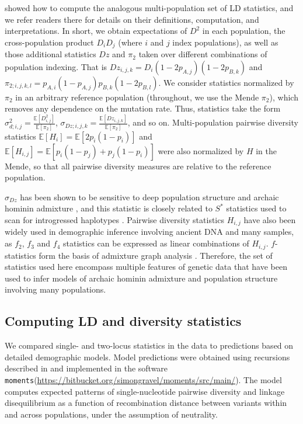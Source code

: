 \documentclass[]{article}
\newcommand{\E}{\mathbb{E}}
\newcommand{\moments}{\texttt{moments}\xspace}
\begin{document}
\citet{Ragsdale2019-nt} showed how to compute the analogous multi-population
set of LD statistics, and we refer readers there for details on their
definitions, computation, and interpretations. In short, we obtain expectations
of $D^2$ in each population, the cross-population product $D_iD_j$ (where $i$
and $j$ index populations), as well as those additional statistics $Dz$ and
$\pi_2$ taken over different combinations of population indexing. That is
$Dz_{i, j, k} = D_i(1-2p_{A,j})(1-2p_{B,k})$ and
$\pi_{2;i,j,k,l}=p_{A,i}(1-p_{A,j})p_{B,k}(1-2p_{B,l})$. We consider statistics
normalized by $\pi_2$ in an arbitrary reference population (throughout, we use the Mende
$\pi_2$), which removes any dependence on the mutation rate. Thus, statistics
take the form $\sigma_{d;i,j}^2 = \frac{\E[D^2_{i,j}]}{\E[\pi_2]}$,
$\sigma_{Dz;i,j,k}=\frac{\E[Dz_{i,j,k}]}{\E[\pi_2]}$, and so on.
Multi-population pairwise diversity statistics $\E[H_i]=\E[2p_i(1-p_i)]$ and
$\E[H_{i,j}] = \E[p_i(1-p_j) + p_j(1-p_i)]$ were also normalized by $H$ in the
Mende, so that all pairwise diversity measures are relative to the reference
population.

$\sigma_{Dz}$ has been shown to be sensitive to deep population structure and
archaic hominin admixture \citep{Ragsdale2019-nt}, and this statistic is closely
related to $S^*$ statistics used to scan for introgressed haplotypes
\citep{Plagnol2006-lt}. Pairwise diversity statistics $H_{i,j}$ have also been
widely used in demographic inference involving ancient DNA and many samples, as
$f_2$, $f_3$ and $f_4$ statistics can be expressed as linear combinations of
$H_{i,j}$. $f$-statistics form the basis of admixture graph analysis
\citep{Lipson2020-cq}. Therefore, the set of statistics used here encompass
multiple features of genetic data that have been used to infer models of
archaic hominin admixture and population structure involving many populations.

\subsection{Computing LD and diversity statistics}\label{sec:computing-stats}

We compared single- and two-locus statistics in the data to predictions based
on detailed demographic models. Model predictions were obtained using
recursions described in \citet{Ragsdale2019-nt} and implemented in the software
\moments (\url{https://bitbucket.org/simongravel/moments/src/main/}).
The model computes expected patterns of single-nucleotide pairwise diversity
and linkage disequilibrium as a function of recombination distance between
variants within and across populations, under the assumption of neutrality.
\end{document}
